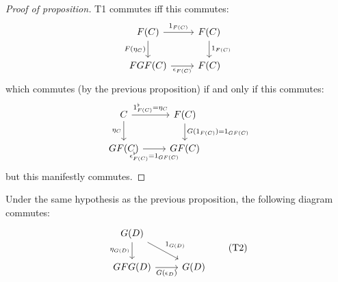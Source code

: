 \documentclass[12pt]{article}
\begin{document}
\begin{proof}[Proof of proposition]
	T1 commutes iff this commutes:
	\begin{equation*}
\begin{tikzcd}
F(C) \arrow[d, "F(\eta_C)"'] \arrow[r, "1_{F(C)}"] & F(C) \arrow[d, "1_{F(C)}"] \\
FGF(C) \arrow[r, "\epsilon_{F(C)}"']               & F(C)                      
\end{tikzcd}
	\end{equation*}
	which commutes (by the previous proposition) if and only if this commutes:
	\begin{equation*}
\begin{tikzcd}
C \arrow[d, "\eta_C"'] \arrow[r, "1_{F(C)}^\flat=\eta_C"] & F(C) \arrow[d, "G(1_{F(C)})=1_{GF(C)}"] \\
GF(C) \arrow[r, "\epsilon_{F(C)}^\flat=1_{GF(C)}"']       & GF(C)                                  
\end{tikzcd}
	\end{equation*}
	but this manifestly commutes.
\end{proof}

\begin{proposition}
	Under the same hypothesis as the previous proposition, the following diagram commutes:
	\begin{equation*}
\begin{tikzcd}
G(D) \arrow[d, "\eta_{G(D)}"'] \arrow[rd, "1_{G(D)}"] &      \\
GFG(D) \arrow[r, "G(\epsilon_D)"']                    & G(D)
\end{tikzcd}
\tag{T2}
	\end{equation*}
\end{proposition}
\end{document}
